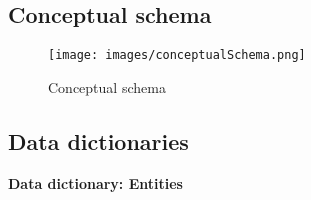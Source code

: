 \documentclass{article}[h]
\begin{document}
\subsection{Conceptual schema}\label{subsec:conceptual-schema}
\begin{figure}[H]
  \centering
  \texttt{[image: images/conceptualSchema.png]}
  \caption{Conceptual schema}\label{fig:figure}
\end{figure}


\subsection{Data dictionaries}\label{subsec:data-dictionaries}

\vspace{12px}

{\centering \textbf{Data dictionary: Entities}\\}
\end{document}
